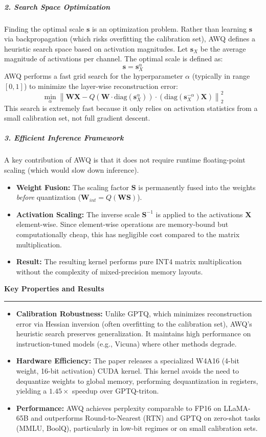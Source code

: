 \documentclass[11pt,a4paper]{article}
\newcommand{\problemp}[1]{%
  \par\medskip
  {\noindent\bfseries\normalsize\color{signcol}#1\par}%
  \vspace{0.4ex}%
  {\noindent\color{softgray}\rule{\linewidth}{0.6pt}\par}%
  \vspace{0.8ex}%
}
\theoremstyle{definition}
\begin{document}
\subparagraph{2. Search Space Optimization}
Finding the optimal scale $\bm{s}$ is an optimization problem. Rather than learning $\bm{s}$ via backpropagation (which risks overfitting the calibration set), AWQ defines a heuristic search space based on activation magnitudes.
Let $\bm{s}_X$ be the average magnitude of activations per channel. The optimal scale is defined as:
\begin{equation}
  \bm{s} = \bm{s}_X^\alpha
\end{equation}
AWQ performs a fast grid search for the hyperparameter $\alpha$ (typically in range $[0, 1]$) to minimize the layer-wise reconstruction error:
\begin{equation}
  \min_{\alpha} \left\| \bm{W}\bm{X} - Q(\bm{W} \cdot \text{diag}(\bm{s}_X^\alpha)) \cdot (\text{diag}(\bm{s}_X^{-\alpha}) \bm{X}) \right\|_2^2
\end{equation}
This search is extremely fast because it only relies on activation statistics from a small calibration set, not full gradient descent.

\subparagraph{3. Efficient Inference Framework}
A key contribution of AWQ is that it does not require runtime floating-point scaling (which would slow down inference).
\begin{itemize}
  \item \textbf{Weight Fusion:} The scaling factor $\bm{S}$ is permanently fused into the weights \textit{before} quantization ($\bm{W}_{int} = Q(\bm{W}\bm{S})$).
  \item \textbf{Activation Scaling:} The inverse scale $\bm{S}^{-1}$ is applied to the activations $\bm{X}$ element-wise. Since element-wise operations are memory-bound but computationally cheap, this has negligible cost compared to the matrix multiplication.
  \item \textbf{Result:} The resulting kernel performs pure INT4 matrix multiplication without the complexity of mixed-precision memory layouts.
\end{itemize}

\problemp{Key Properties and Results}
\begin{itemize}
  \item \textbf{Calibration Robustness:} Unlike GPTQ, which minimizes reconstruction error via Hessian inversion (often overfitting to the calibration set), AWQ's heuristic search preserves generalization. It maintains high performance on instruction-tuned models (e.g., Vicuna) where other methods degrade.
  \item \textbf{Hardware Efficiency:} The paper releases a specialized W4A16 (4-bit weight, 16-bit activation) CUDA kernel. This kernel avoids the need to dequantize weights to global memory, performing dequantization in registers, yielding a $1.45\times$ speedup over GPTQ-triton.
  \item \textbf{Performance:} AWQ achieves perplexity comparable to FP16 on LLaMA-65B and outperforms Round-to-Nearest (RTN) and GPTQ on zero-shot tasks (MMLU, BoolQ), particularly in low-bit regimes or on small calibration sets.
\end{itemize}
\end{document}
